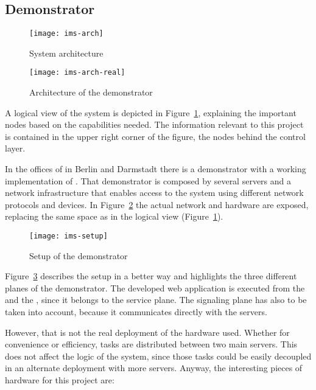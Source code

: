 \subsection{ Demonstrator} %
\label{sub:demonstrator}

\begin{figure}[p]
  \centering
    \texttt{[image: ims-arch]}
  \caption{System architecture}
  \label{fig:ims-arch}
\end{figure}

\begin{figure}[p]
  \centering
    \texttt{[image: ims-arch-real]}
  \caption{Architecture of the demonstrator}
  \label{fig:ims-arch-real}
\end{figure}

A logical view of the system is depicted in Figure~\ref{fig:ims-arch}, explaining the important nodes based on the capabilities needed.
The information relevant to this project is contained in the upper right corner of the figure, the nodes behind the control layer.

In the offices of  in Berlin and Darmstadt there is a demonstrator with a working implementation of .
That demonstrator is composed by several servers and a network infrastructure that enables access to the system using different network protocols and devices.
In Figure~\ref{fig:ims-arch-real} the actual network and hardware are exposed, replacing the same space as in the logical view (Figure~\ref{fig:ims-arch}).

\begin{figure}[htbp]
  \centering
    \texttt{[image: ims-setup]}
  \caption{Setup of the demonstrator}
  \label{fig:ims-setup}
\end{figure}

Figure~\ref{fig:ims-setup} describes the setup in a better way and highlights the three different planes of the demonstrator.
The developed web application is executed from the  and the , since it belongs to the service plane.
The signaling plane has also to be taken into account, because it communicates directly with the servers.

However, that is not the real deployment of the hardware used.
Whether for convenience or efficiency, tasks are distributed between two main servers.
This does not affect the logic of the system, since those tasks could be easily decoupled in an alternate deployment with more servers.
Anyway, the interesting pieces of hardware for this project are:

